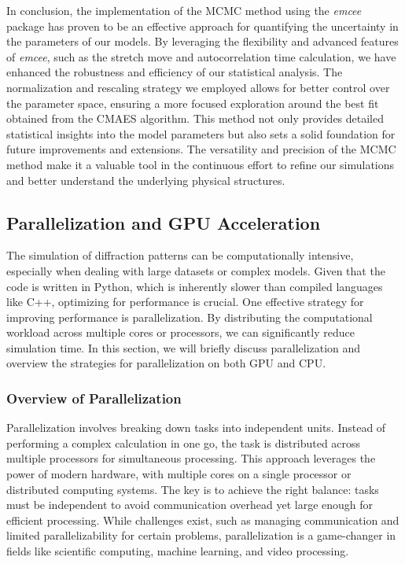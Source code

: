 \FloatBarrier

In conclusion, the implementation of the MCMC method using the \textit{emcee} package has proven to be an effective
approach for quantifying the uncertainty in the parameters of our models. By leveraging the flexibility and advanced
features of \textit{emcee}, such as the stretch move and autocorrelation time calculation, we have enhanced the robustness
and efficiency of our statistical analysis. The normalization and rescaling strategy we employed allows for better
control over the parameter space, ensuring a more focused exploration around the best fit obtained from the CMAES
algorithm. This method not only provides detailed statistical insights into the model parameters but also sets 
a solid foundation for future improvements and extensions. The versatility and precision of the MCMC method make 
it a valuable tool in the continuous effort to refine our simulations and better understand the underlying physical structures.


\subsection{Parallelization and GPU Acceleration}

The simulation of diffraction patterns can be computationally intensive, especially when dealing with large datasets or complex models. 
Given that the code is written in Python, which is inherently slower than compiled languages like C++, optimizing for performance is crucial. 
One effective strategy for improving performance is parallelization. By distributing the computational workload across multiple cores or processors, 
we can significantly reduce simulation time. In this section, we will briefly discuss parallelization and overview the strategies for parallelization 
on both GPU and CPU.

\medskip

\subsubsection{Overview of Parallelization}

Parallelization involves breaking down tasks into independent units. Instead of performing a complex calculation in one go, the task is 
distributed across multiple processors for simultaneous processing. This approach leverages the power of modern hardware, with multiple cores 
on a single processor or distributed computing systems. The key is to achieve the right balance: tasks must be independent to avoid communication 
overhead yet large enough for efficient processing. While challenges exist, such as managing communication and limited parallelizability for certain 
problems, parallelization is a game-changer in fields like scientific computing, machine learning, and video processing.

